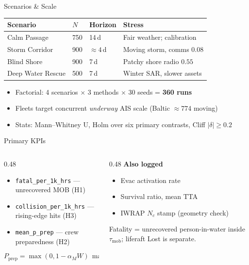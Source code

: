 \documentclass[aspectratio=169]{beamer}
\begin{document}
\begin{frame}{Scenarios \& Scale}
    \centering
    \small
    \begin{tabular}{@{}llll@{}}
        \toprule
        \textbf{Scenario} & \textbf{$N$} & \textbf{Horizon} & \textbf{Stress} \\
        \midrule
        Calm Passage & 750 & 14\,d & Fair weather; calibration \\
        Storm Corridor & 900 & ${\approx}4$\,d & Moving storm, comms $0.08$ \\
        Blind Shore & 900 & 7\,d & Patchy shore radio $0.55$ \\
        Deep Water Rescue & 500 & 7\,d & Winter SAR, slower assets \\
        \bottomrule
    \end{tabular}

    \vspace{1.8em}
    \begin{itemize}
        \item Factorial: 4 scenarios $\times$ 3 methods $\times$ 30 seeds = \textbf{360 runs}
        \item Fleets target concurrent \emph{underway} AIS scale (Baltic ${\approx}774$ moving)
        \item Stats: Mann--Whitney U, Holm over six primary contrasts, Cliff $|\delta|\ge0.2$
    \end{itemize}
\end{frame}

\begin{frame}{Primary KPIs}
    \begin{columns}[T]
        \begin{column}{0.48\textwidth}
            \begin{itemize}
                \item \texttt{fatal\_per\_1k\_hrs} --- unrecovered MOB (H1)
                \item \texttt{collision\_per\_1k\_hrs} --- rising-edge hits (H3)
                \item \texttt{mean\_p\_prep} --- crew preparedness (H2)
            \end{itemize}
            {\small
            \[
              P_{\text{prep}} = \max(0,1-\alpha_M W)\,\max(0,1-0.70\,F)
            \]}
        \end{column}
        \begin{column}{0.48\textwidth}
            \textbf{Also logged}
            \begin{itemize}
                \item Evac activation rate
                \item Survival ratio, mean TTA
                \item IWRAP $N_c$ stamp (geometry check)
            \end{itemize}
            \vspace{0.5em}
            Fatality = unrecovered person-in-water inside $\tau_{\text{mob}}$; liferaft Lost is separate.
        \end{column}
    \end{columns}
\end{frame}
\end{document}
